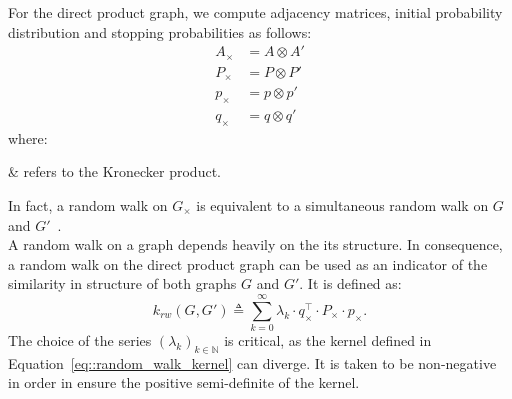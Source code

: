                 For the direct product graph, we compute adjacency matrices, initial probability distribution and stopping probabilities as follows:
                \begin{align}
                    \label{eq::direct_product_graph_walk}
                    A_{\times} &= A \otimes A'\\
                    P_{\times} &= P \otimes P'\\
                    p_{\times} &= p \otimes p'\\
                    q_{\times} &= q \otimes q'
                \end{align}
                where:
                \begin{conditions}
                    \otimes & refers to the Kronecker product.
                \end{conditions}
                In fact, a random walk on $G_{\times}$ is equivalent to a simultaneous random walk on $G$ and $G'$~\parencite{hammack2011handbook}.\\

                A random walk on a graph depends heavily on the its structure.
                In consequence, a random walk on the direct product graph can be used as an indicator of the similarity in structure of both graphs $G$ and $G'$.
                It is defined as:
                \begin{equation}
                    \label{eq::random_walk_kernel}
                    k_{rw}(G, G') \triangleq \sum_{k=0}^\infty \lambda_k \cdot q_{\times}^\intercal\cdot P_{\times}\cdot p_{\times}.
                \end{equation}
                The choice of the series $\left(\lambda_k\right)_{k\in \mathbb{N}}$ is critical, as the kernel defined in Equation~\ref{eq::random_walk_kernel} can diverge.
                It is taken to be non-negative in order in ensure the positive semi-definite of the kernel.\\

